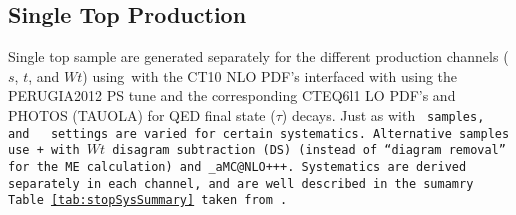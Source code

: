 \subsection{Single Top Production}
Single top sample are generated separately for the different production channels ($s$, $t$, and $Wt$) using \powheg\,with the CT10 NLO PDF's interfaced with  using the PERUGIA2012 PS tune and the corresponding CTEQ6l1 LO PDF's and PHOTOS (TAUOLA) for QED final state ($\tau$) decays.%
  Just as with \tt\,samples, \powheg\,and \pythia\, settings are varied for certain systematics.  Alternative samples use \powheg+ with $Wt$ disagram subtraction (DS) (instead of ``diagram removal'' for the ME calculation) and \_aMC@NLO+\herwig++.  Systematics are derived separately in each channel, and are well described in the sumamry Table \ref{tab:stopSysSummary} taken from \cite{modelingnote}.

